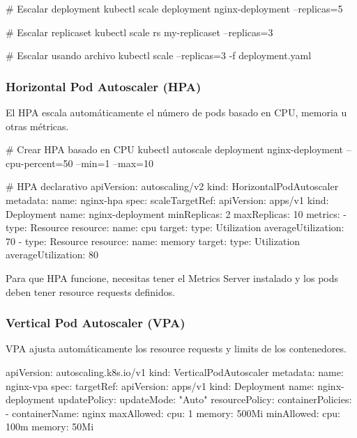 \documentclass[11pt,a4paper]{article}
\begin{document}
\begin{commandbox}
\# Escalar deployment
kubectl scale deployment nginx-deployment --replicas=5

\# Escalar replicaset
kubectl scale rs my-replicaset --replicas=3

\# Escalar usando archivo
kubectl scale --replicas=3 -f deployment.yaml
\end{commandbox}

\subsubsection{Horizontal Pod Autoscaler (HPA)}

El HPA escala automáticamente el número de pods basado en CPU, memoria u otras métricas.

\begin{commandbox}
\# Crear HPA basado en CPU
kubectl autoscale deployment nginx-deployment --cpu-percent=50 --min=1 --max=10

\# HPA declarativo
apiVersion: autoscaling/v2
kind: HorizontalPodAutoscaler
metadata:
  name: nginx-hpa
spec:
  scaleTargetRef:
    apiVersion: apps/v1
    kind: Deployment
    name: nginx-deployment
  minReplicas: 2
  maxReplicas: 10
  metrics:
  - type: Resource
    resource:
      name: cpu
      target:
        type: Utilization
        averageUtilization: 70
  - type: Resource
    resource:
      name: memory
      target:
        type: Utilization
        averageUtilization: 80
\end{commandbox}

\begin{warningbox}
Para que HPA funcione, necesitas tener el Metrics Server instalado y los pods deben tener resource requests definidos.
\end{warningbox}

\subsubsection{Vertical Pod Autoscaler (VPA)}

VPA ajusta automáticamente los resource requests y limits de los contenedores.

\begin{commandbox}
apiVersion: autoscaling.k8s.io/v1
kind: VerticalPodAutoscaler
metadata:
  name: nginx-vpa
spec:
  targetRef:
    apiVersion: apps/v1
    kind: Deployment
    name: nginx-deployment
  updatePolicy:
    updateMode: "Auto"
  resourcePolicy:
    containerPolicies:
    - containerName: nginx
      maxAllowed:
        cpu: 1
        memory: 500Mi
      minAllowed:
        cpu: 100m
        memory: 50Mi
\end{commandbox}
\end{document}
